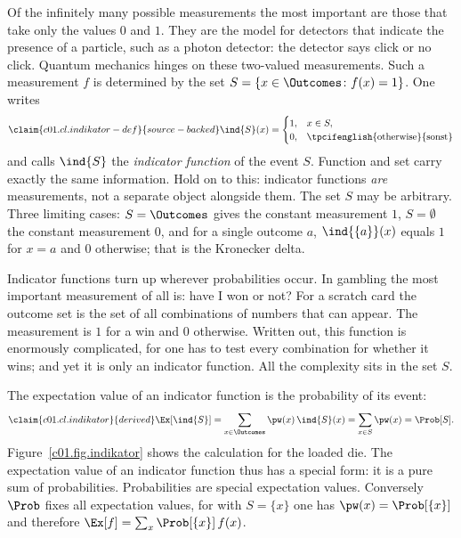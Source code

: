 Of the infinitely many possible measurements the most important are those that take only
the values $0$ and $1$. They are the model for detectors that indicate the presence of a
particle, such as a photon detector: the detector says click or no click. Quantum mechanics
hinges on these two-valued measurements.
Such a measurement $f$ is determined by the set $S = \{x \in \Outcomes \colon f(x) = 1\}$.
One writes
\begin{equation}\label{c01.eq.indikator-def}\claim{c01.cl.indikator-def}{source-backed}
  \ind{S}(x) =
  \begin{cases}
    1, & x \in S, \\
    0, & \text{\tpcifenglish{otherwise}{sonst}}
  \end{cases}
\end{equation}
and calls $\ind{S}$ the \emph{indicator function} of the event $S$. Function and set carry
exactly the same information. Hold on to this: indicator functions \emph{are} measurements,
not a separate object alongside them. The set $S$ may be arbitrary. Three limiting cases:
$S = \Outcomes$ gives the constant measurement $1$, $S = \emptyset$ the constant measurement
$0$, and for a single outcome $a$, $\ind{\{a\}}(x)$ equals $1$ for $x = a$ and $0$
otherwise; that is the Kronecker delta.

\begin{remark}
  Indicator functions turn up wherever probabilities occur. In gambling the most important
  measurement of all is: have I won or not? For a scratch card the outcome set is the set of
  all combinations of numbers that can appear. The measurement is $1$ for a win and $0$
  otherwise. Written out, this function is enormously complicated, for one has to test every
  combination for whether it wins; and yet it is only an indicator function. All the
  complexity sits in the set $S$.
\end{remark}

The expectation value of an indicator function is the probability of its event:
\begin{equation}\label{c01.eq.indikator}\claim{c01.cl.indikator}{derived}
  \Ex[\ind{S}] = \sum_{x \in \Outcomes} \pw(x)\, \ind{S}(x) = \sum_{x \in S} \pw(x) = \Prob[S] .
\end{equation}
Figure~\ref{c01.fig.indikator} shows the calculation for the loaded die. The expectation
value of an indicator function thus has a special form: it is a pure sum of probabilities.
Probabilities are special expectation values. Conversely $\Prob$ fixes all
expectation values, for with $S = \{x\}$ one has $\pw(x) = \Prob[\{x\}]$ and therefore
$\Ex[f] = \sum_{x} \Prob[\{x\}]\, f(x)$.

